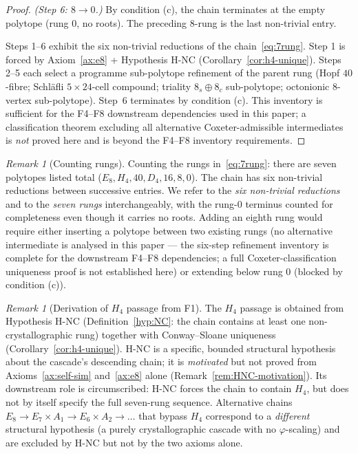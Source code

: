 \documentclass[12pt]{article}
\theoremstyle{definition}
\theoremstyle{remark}
\newtheorem{remark}[theorem]{Remark}
\begin{document}
\begin{proof}
\emph{(Step 6: $8 \to 0$.)} By condition (c), the chain terminates at the empty polytope (rung $0$, no roots). The preceding $8$-rung is the last non-trivial entry.

Steps 1--6 exhibit the six non-trivial reductions of the chain~\eqref{eq:7rung}. Step 1 is forced by Axiom~\ref{ax:e8} + Hypothesis H-NC (Corollary~\ref{cor:h4-unique}). Steps 2--5 each select a programme sub-polytope refinement of the parent rung (Hopf $40$-fibre; Schl\"afli $5 \times 24$-cell compound; triality $8_s \oplus 8_c$ sub-polytope; octonionic $8$-vertex sub-polytope). Step~6 terminates by condition (c). This inventory is sufficient for the F4--F8 downstream dependencies used in this paper; a classification theorem excluding all alternative Coxeter-admissible intermediates is \emph{not} proved here and is beyond the F4--F8 inventory requirements.
\end{proof}

\begin{remark}[Counting rungs]\label{rem:seven-rungs}
Counting the rungs in~\eqref{eq:7rung}: there are seven polytopes listed total ($E_8, H_4, 40, D_4, 16, 8, 0$). The chain has six non-trivial reductions between successive entries. We refer to the \emph{six non-trivial reductions} and to the \emph{seven rungs} interchangeably, with the rung-$0$ terminus counted for completeness even though it carries no roots. Adding an eighth rung would require either inserting a polytope between two existing rungs (no alternative intermediate is analysed in this paper --- the six-step refinement inventory is complete for the downstream F4--F8 dependencies; a full Coxeter-classification uniqueness proof is not established here) or extending below rung $0$ (blocked by condition (c)).
\end{remark}

\begin{remark}[Derivation of $H_4$ passage from F1]\label{rem:h4-derived}
The $H_4$ passage is obtained from Hypothesis H-NC (Definition~\ref{hyp:NC}: the chain contains at least one non-crystallographic rung) together with Conway--Sloane uniqueness (Corollary~\ref{cor:h4-unique}). H-NC is a specific, bounded structural hypothesis about the cascade's descending chain; it is \emph{motivated} but not proved from Axioms~\ref{ax:self-sim} and~\ref{ax:e8} alone (Remark~\ref{rem:HNC-motivation}). Its downstream role is circumscribed: H-NC forces the chain to contain $H_4$, but does not by itself specify the full seven-rung sequence. Alternative chains $E_8 \to E_7 \times A_1 \to E_6 \times A_2 \to \ldots$ that bypass $H_4$ correspond to a \emph{different} structural hypothesis (a purely crystallographic cascade with no $\varphi$-scaling) and are excluded by H-NC but not by the two axioms alone.
\end{remark}
\end{document}
